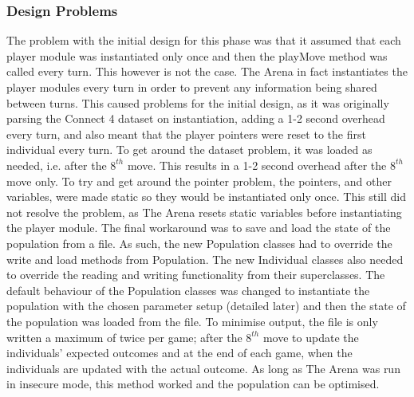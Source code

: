 \subsubsection{Design Problems}
The problem with the initial design for this phase was that it assumed that each player module was instantiated only once and then the playMove method was called every turn. This however is not the case. The Arena in fact instantiates the player modules every turn in order to prevent any information being shared between turns. This caused problems for the initial design, as it was originally parsing the Connect 4 dataset on instantiation, adding a 1-2 second overhead every turn, and also meant that the player pointers were reset to the first individual every turn. To get around the dataset problem, it was loaded as needed, i.e. after the $8^{th}$ move. This results in a 1-2 second overhead after the $8^{th}$ move only. To try and get around the pointer problem, the pointers, and other variables, were made static so they would be instantiated only once. This still did not resolve the problem, as The Arena resets static variables before instantiating the player module. The final workaround was to save and load the state of the population from a file. As such, the new Population classes had to override the write and load methods from Population. The new Individual classes also needed to override the reading and writing functionality from their superclasses. The default behaviour of the Population classes was changed to instantiate the population with the chosen parameter setup (detailed later) and then the state of the population was loaded from the file. To minimise output, the file is only written a maximum of twice per game; after the $8^{th}$ move to update the individuals' expected outcomes and at the end of each game, when the individuals are updated with the actual outcome. As long as The Arena was run in insecure mode, this method worked and the population can be optimised.

